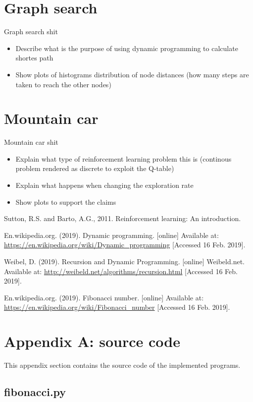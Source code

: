 \documentclass[runningheads]{llncs}
\begin{document}
\section{Graph search}
Graph search shit
\begin{itemize}
\item Describe what is the purpose of using dynamic programming to
  calculate shortes path
\item Show plots of histograms distribution of node distances (how
  many steps are taken to reach the other nodes)
\end{itemize}

\section{Mountain car}
Mountain car shit
\begin{itemize}
\item Explain what type of reinforcement learning problem this is
  (continous problem rendered as discrete to exploit the Q-table)
\item Explain what happens when changing the exploration rate
\item Show plots to support the claims
\end{itemize}


\begin{thebibliography}{8}

Sutton, R.S. and Barto, A.G., 2011. Reinforcement learning: An introduction.

En.wikipedia.org. (2019). Dynamic programming. [online] Available at: \url{https://en.wikipedia.org/wiki/Dynamic\_programming} [Accessed 16 Feb. 2019].

Weibel, D. (2019). Recursion and Dynamic Programming. [online] Weibeld.net. Available at: \url{http://weibeld.net/algorithms/recursion.html} [Accessed 16 Feb. 2019].

En.wikipedia.org. (2019). Fibonacci number. [online] Available at: \url{https://en.wikipedia.org/wiki/Fibonacci\_number} [Accessed 16 Feb. 2019].

\end{thebibliography}


\section{Appendix A: source code}\label{appendix}
This appendix section contains the source code of the implemented programs.

\subsection{fibonacci.py}\label{fibonacci_code}

\end{document}
